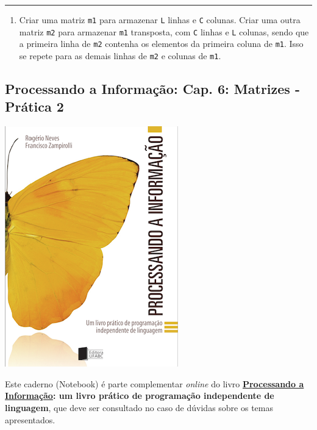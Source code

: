 \documentclass[12pt,a4paper]{article}
\providecommand{\tightlist}{%
      \setlength{\itemsep}{0pt}\setlength{\parskip}{0pt}}
\begin{document}
    \begin{center}\rule{0.5\linewidth}{0.5pt}\end{center}

\begin{enumerate}
\def\labelenumi{\arabic{enumi}.}
\setcounter{enumi}{4}
\tightlist
\item
  Criar uma matriz \texttt{m1} para armazenar \texttt{L} linhas e
  \texttt{C} colunas. Criar uma outra matriz \texttt{m2} para armazenar
  \texttt{m1} transposta, com \texttt{C} linhas e \texttt{L} colunas,
  sendo que a primeira linha de \texttt{m2} contenha os elementos da
  primeira coluna de \texttt{m1}. Isso se repete para as demais linhas
  de \texttt{m2} e colunas de \texttt{m1}.
\end{enumerate}

    \hypertarget{processando-a-informauxe7uxe3o-cap.-6-matrizes---pruxe1tica-2}{%
\subsection{Processando a Informação: Cap. 6: Matrizes - Prática
2}\label{processando-a-informauxe7uxe3o-cap.-6-matrizes---pruxe1tica-2}}

    \includegraphics{"figs/Capa_Processando_Informacao.jpg"}

Este caderno (Notebook) é parte complementar \emph{online} do livro
\textbf{\href{https://editora.ufabc.edu.br/matematica-e-ciencias-da-computacao/58-processando-a-informacao}{Processando
a Informação}: um livro prático de programação independente de
linguagem}, que deve ser consultado no caso de dúvidas sobre os temas
apresentados.
\end{document}
